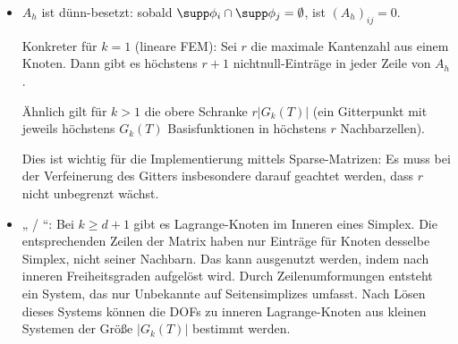 \begin{note}
	\begin{itemize}
		\item
			$A_h$ ist dünn-besetzt:
			sobald $\supp \phi_i \cap \supp \phi_j = \emptyset$, ist $(A_h)_{ij} = 0$.

			Konkreter für $k = 1$ (lineare FEM):
			Sei $r$ die maximale Kantenzahl aus einem Knoten.
			Dann gibt es höchstens $r+1$ nichtnull-Einträge in jeder Zeile von $A_h$.

			Ähnlich gilt für $k > 1$ die obere Schranke $r |G_k(T)|$ (ein Gitterpunkt mit jeweils höchstens $G_k(T)$ Basisfunktionen in höchstens $r$ Nachbarzellen).

			Dies ist wichtig für die Implementierung mittels Sparse-Matrizen:
			Es muss bei der Verfeinerung des Gitters insbesondere darauf geachtet werden, dass $r$ nicht unbegrenzt wächst.
		\item
			„ / “:
			Bei $k \ge d + 1$ gibt es Lagrange-Knoten im Inneren eines Simplex.
			Die entsprechenden Zeilen der Matrix haben nur Einträge für Knoten desselbe Simplex, nicht seiner Nachbarn.
			Das kann ausgenutzt werden, indem nach inneren Freiheitsgraden aufgelöst wird.
			Durch Zeilenumformungen entsteht ein System, das nur Unbekannte auf Seitensimplizes umfasst.
			Nach Lösen dieses Systems können die DOFs zu inneren Lagrange-Knoten aus kleinen Systemen der Größe $|G_k(T)|$ bestimmt werden.
	\end{itemize}
\end{note}

